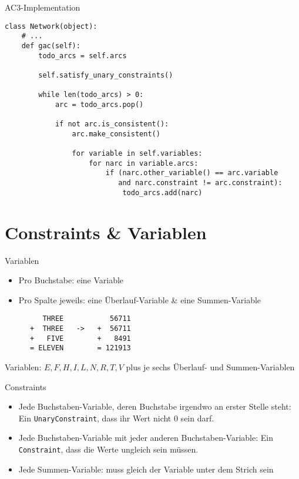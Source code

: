 \documentclass[10pt]{beamer}
\begin{document}
\begin{frame}[fragile]{AC3-Implementation}
    \begin{verbatim}
class Network(object):
    # ...
    def gac(self):
        todo_arcs = self.arcs

        self.satisfy_unary_constraints()

        while len(todo_arcs) > 0:
            arc = todo_arcs.pop()

            if not arc.is_consistent():
                arc.make_consistent()

                for variable in self.variables:
                    for narc in variable.arcs:
                        if (narc.other_variable() == arc.variable
                           and narc.constraint != arc.constraint):
                            todo_arcs.add(narc)
    \end{verbatim}
\end{frame}

\section{Constraints \& Variablen}

\begin{frame}[fragile]{Variablen}
    \begin{itemize}
        \item Pro Buchstabe: eine Variable
        \item Pro Spalte jeweils: eine Überlauf-Variable \& eine Summen-Variable
    \end{itemize}
\end{frame}

\begin{frame}[fragile]{}

\begin{verbatim}
         THREE           56711
      +  THREE   ->   +  56711
      +   FIVE        +   8491
      = ELEVEN        = 121913
\end{verbatim}

Variablen: $ {E, F, H, I, L, N, R, T, V} $ plus je sechs Überlauf- und Summen-Variablen

\end{frame}

\begin{frame}[fragile]{Constraints}
    \begin{itemize}
        \item Jede Buchstaben-Variable, deren Buchstabe irgendwo an erster Stelle steht:
            Ein \texttt{UnaryConstraint}, dass ihr Wert nicht 0 sein darf.
        \item Jede Buchstaben-Variable mit jeder anderen Buchstaben-Variable:
            Ein \texttt{Constraint}, dass die Werte ungleich sein müssen.
        \item Jede Summen-Variable: muss gleich der Variable unter dem Strich sein
            \Lightning
    \end{itemize}
\end{frame}
\end{document}
